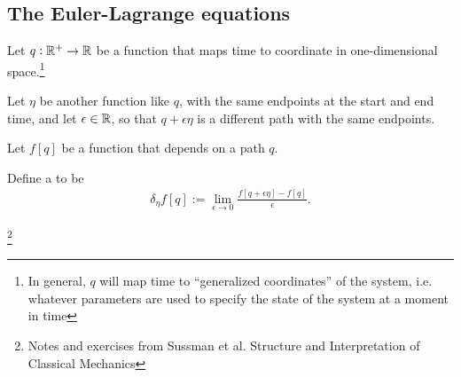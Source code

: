 \subsection{The Euler-Lagrange equations}

Let $q:\mathbb{R}^+ \to \mathbb{R}$ be a function that maps time to coordinate in one-dimensional space.\footnote{In
  general, $q$ will map time to ``generalized coordinates'' of the system, i.e. whatever parameters
  are used to specify the state of the system at a moment in time}

Let $\eta$ be another function like $q$, with the same endpoints at the start and end time, and
let $\epsilon \in \mathbb{R}$, so that $q + \epsilon\eta$ is a different path with the same endpoints.


Let $f[q]$ be a function that depends on a path $q$.

Define a  to be
\begin{align*}
  \delta_{\eta}f[q] := \lim_{\epsilon \to 0} \frac{f[q + \epsilon\eta] - f[q]}{\epsilon}.
\end{align*}

\newpage
\footnote{Notes and exercises from Sussman et al. Structure and Interpretation of Classical Mechanics}
